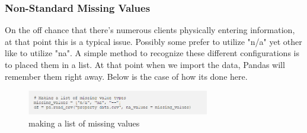 \documentclass[oneside,12pt]{Classes/VTU}
\begin{document}
	\subsubsection{Non-Standard Missing Values}
	On the off chance that there's numerous clients physically entering information, at that point this is a typical issue. Possibly some prefer to utilize "n/a" yet other like to utilize "na". A simple method to recognize these different configurations is to placed them in a list. At that point when we import the data, Pandas will remember them right away. Below is the case of how its done here.
	\begin{figure}
  	\begin{center}
  			\includegraphics[width=8cm]{images/datacleaning.png}
  			\caption{making a list of missing values}
  	\end{center}
  \end{figure}
  
\end{document}
